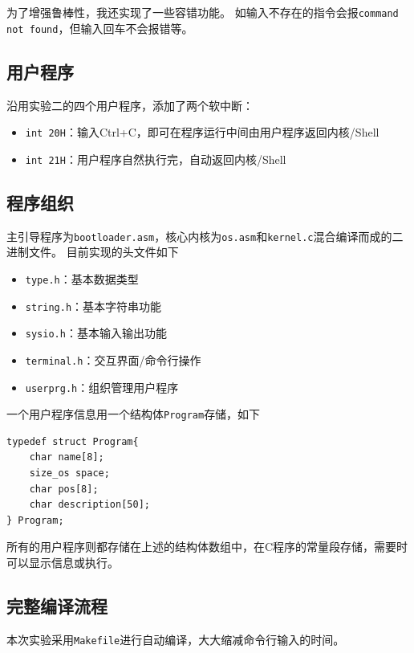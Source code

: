 \documentclass[logo,reportComp]{thesis}
\begin{document}
为了增强鲁棒性，我还实现了一些容错功能。
如输入不存在的指令会报\verb'command not found'，但输入回车不会报错等。

\subsection{用户程序}
沿用实验二的四个用户程序，添加了两个软中断：
\begin{itemize}
    \item \verb'int 20H'：输入Ctrl+C，即可在程序运行中间由用户程序返回内核/Shell
    \item \verb'int 21H'：用户程序自然执行完，自动返回内核/Shell
\end{itemize}

\subsection{程序组织}
主引导程序为\verb'bootloader.asm'，核心内核为\verb'os.asm'和\verb'kernel.c'混合编译而成的二进制文件。
目前实现的头文件如下
\begin{itemize}
    \item \verb'type.h'：基本数据类型
    \item \verb'string.h'：基本字符串功能
    \item \verb'sysio.h'：基本输入输出功能
    \item \verb'terminal.h'：交互界面/命令行操作
    \item \verb'userprg.h'：组织管理用户程序
\end{itemize}

一个用户程序信息用一个结构体\verb'Program'存储，如下
\begin{lstlisting}
typedef struct Program{
    char name[8];
    size_os space;
    char pos[8];
    char description[50];
} Program;
\end{lstlisting}

所有的用户程序则都存储在上述的结构体数组中，在C程序的常量段存储，需要时可以显示信息或执行。

\subsection{完整编译流程}
本次实验采用\verb'Makefile'进行自动编译，大大缩减命令行输入的时间。
\end{document}
